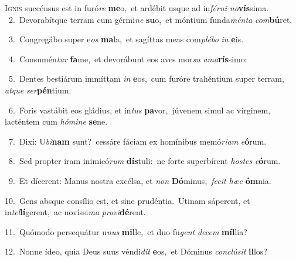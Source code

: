 \lettrine{\initial\textcolor{\initialcolor}{I}}{gnis} succénsus est in furó\textit{re} \textbf{me}\-o,~\star et ardébit usque ad in\-\textit{fér}\-\textit{ni} \textit{no}\-\textbf{vís}sima.\\
{\numbfont\textcolor{\numbcolor}{~2.}}~Devorabítque terram cum gérmi\textit{ne} \textbf{su}\-o,~\star et móntium funda\-\textit{mén}\-\textit{ta} \textit{com}\-\textbf{bú}ret.\par
{\numbfont\textcolor{\numbcolor}{~3.}}~Congregábo super e\textit{os} \textbf{ma}\-la,~\star et sagíttas meas com\-\textit{plé}\-\textit{bo} \textit{in} \textbf{e}\-is.\par
{\numbfont\textcolor{\numbcolor}{~4.}}~Consumén\textit{tur} \textbf{fa}\-me,~\star et devorábunt eos aves mor\textit{su} \textit{a}\-\textit{ma}\textbf{rís}simo:\par
{\numbfont\textcolor{\numbcolor}{~5.}}~Dentes bestiárum immíttam \textit{in} \textbf{e}\-os,~\star cum furóre trahéntium super terram, \textit{at}\-\textit{que} \textit{ser}\-\textbf{pén}tium.\par
{\numbfont\textcolor{\numbcolor}{~6.}}~Foris vastábit eos gládius, et in\textit{tus} \textbf{pa}\-vor,~\star júvenem simul ac vírginem, lacténtem cum \textit{hó}\-\textit{mi}\textit{ne} \textbf{se}\-ne.\par
{\numbfont\textcolor{\numbcolor}{~7.}}~Dixi: U\-\textit{bi}\-\textbf{nam} sunt?~\star cessáre fáciam ex homínibus memó\-\textit{ri}\-\textit{am} \textit{e}\-\textbf{ó}rum.\par
{\numbfont\textcolor{\numbcolor}{~8.}}~Sed propter iram inimicó\textit{rum} \textbf{dís}\-tuli:~\star ne forte superbírent \textit{hos}\-\textit{tes} \textit{e}\-\textbf{ó}rum.\par
{\numbfont\textcolor{\numbcolor}{~9.}}~Et dícerent: Manus nostra excélsa, et \textit{non} \textbf{Dó}\-minus,~\star \textit{fe}\-\textit{cit} \textit{hæc} \textbf{óm}\-nia.\par
{\numbfont\textcolor{\numbcolor}{10.}}~Gens absque consílio est, et sine prudéntia.~\dagger Utinam sáperent, et in\-\textit{tel}\-\textbf{lí}gerent,~\star ac novíssi\textit{ma} \textit{pro}\-\textit{vi}\textbf{dé}rent.\par
{\numbfont\textcolor{\numbcolor}{11.}}~Quómodo persequátur u\textit{nus} \textbf{mil}\-le,~\star et duo fu\textit{gent} \textit{de}\-\textit{cem} \textbf{míl}\-lia?\par
{\numbfont\textcolor{\numbcolor}{12.}}~Nonne ídeo, quia Deus suus véndi\textit{dit} \textbf{e}\-os,~\star et Dóminus \textit{con}\-\textit{clú}\textit{sit} \textbf{il}\-los?\par
